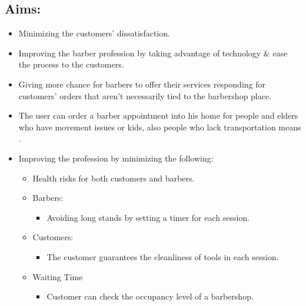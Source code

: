 \documentclass{article}
\begin{document}
      \subsection{Aims: }
      \begin{itemize}
        \item Minimizing the customers' dissatisfaction.
        \item Improving the barber profession by taking advantage of technology \& ease the process to the customers.
        \item Giving more chance for barbers to offer their services responding for customers' orders that aren’t necessarily tied to the barbershop place.
        \item The user can order a barber appointment into his home for people and elders who have movement issues or kids, also people who lack transportation means .
        \item Improving the profession by minimizing the following:
        \begin{itemize}
            \item Health risks for both customers and barbers.
            \item Barbers: 
            \begin{itemize}
                \item Avoiding long stands by setting a timer for each session.
            \end{itemize}
            \item Customers:
            \begin{itemize}
                \item The customer guarantees the cleanliness of tools in each session.
            \end{itemize}
            \item Waiting Time
            \begin{itemize}
                \item Customer can check the occupancy level of a barbershop.
            \end{itemize}
        \end{itemize}
      \end{itemize}
\end{document}
